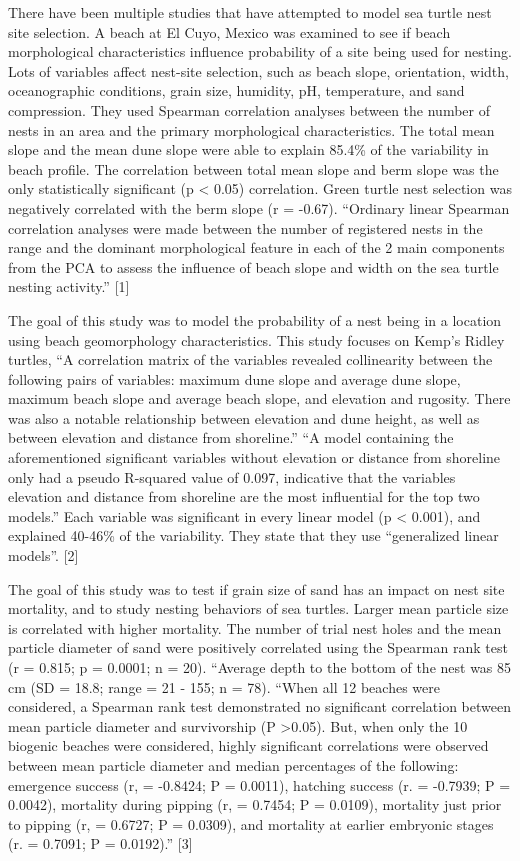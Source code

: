 \documentclass[
]{article}
\begin{document}
There have been multiple studies that have attempted to model sea turtle nest site selection. A beach at El Cuyo, Mexico was examined to see if beach morphological characteristics influence probability of a site being used for nesting. Lots of variables affect nest-site selection, such as beach slope, orientation, width, oceanographic conditions, grain size, humidity, pH, temperature, and sand compression. They used Spearman correlation analyses between the number of nests in an area and the primary morphological characteristics. The total mean slope and the mean dune slope were able to explain 85.4\% of the variability in beach profile. The correlation between total mean slope and berm slope was the only statistically significant (p \textless{} 0.05) correlation. Green turtle nest selection was negatively correlated with the berm slope (r = -0.67). ``Ordinary linear Spearman correlation analyses were made between the number of registered nests in the range and the dominant morphological feature in each of the 2 main components from the PCA to assess the influence of beach slope and width on the sea turtle nesting activity.'' {[}1{]}

The goal of this study was to model the probability of a nest being in a location using beach geomorphology characteristics. This study focuses on Kemp's Ridley turtles, ``A correlation matrix of the variables revealed collinearity between the following pairs of variables: maximum dune slope and average dune slope, maximum beach slope and average beach slope, and elevation and rugosity. There was also a notable relationship between elevation and dune height, as well as between elevation and distance from shoreline.'' ``A model containing the aforementioned significant variables without elevation or distance from shoreline only had a pseudo R-squared value of 0.097, indicative that the variables elevation and distance from shoreline are the most influential for the top two models.'' Each variable was significant in every linear model (p \textless{} 0.001), and explained 40-46\% of the variability. They state that they use ``generalized linear models''. {[}2{]}

The goal of this study was to test if grain size of sand has an impact on nest site mortality, and to study nesting behaviors of sea turtles. Larger mean particle size is correlated with higher mortality. The number of trial nest holes and the mean particle diameter of sand were positively correlated using the Spearman rank test (r = 0.815; p = 0.0001; n = 20). ``Average depth to the bottom of the nest was 85 cm (SD = 18.8; range = 21 - 155; n = 78). ``When all 12 beaches were considered, a Spearman rank test demonstrated no significant correlation between mean particle diameter and survivorship (P \textgreater0.05). But, when only the 10 biogenic beaches were considered, highly significant correlations were observed between mean particle diameter and median percentages of the following: emergence success (r, = -0.8424; P = 0.0011), hatching success (r. = -0.7939; P = 0.0042), mortality during pipping (r, = 0.7454; P = 0.0109), mortality just prior to pipping (r, = 0.6727; P = 0.0309), and mortality at earlier embryonic stages (r. = 0.7091; P = 0.0192).'' {[}3{]}
\end{document}
